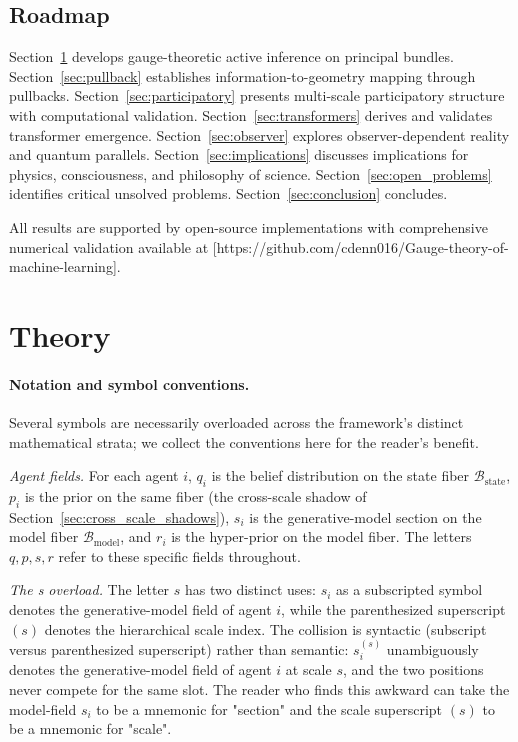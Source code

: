 \documentclass[11pt]{article}
\begin{document}
\subsection{Roadmap}

Section~\ref{sec:framework} develops gauge-theoretic active inference on principal bundles. Section~\ref{sec:pullback} establishes information-to-geometry mapping through pullbacks. Section~\ref{sec:participatory} presents multi-scale participatory structure with computational validation. Section~\ref{sec:transformers} derives and validates transformer emergence. Section~\ref{sec:observer} explores observer-dependent reality and quantum parallels. Section~\ref{sec:implications} discusses implications for physics, consciousness, and philosophy of science. Section~\ref{sec:open_problems} identifies critical unsolved problems. Section~\ref{sec:conclusion} concludes.

All results are supported by open-source implementations with comprehensive numerical validation available at [https://github.com/cdenn016/Gauge-theory-of-machine-learning].

\section{Theory}
\label{sec:framework}

\paragraph{Notation and symbol conventions.}
Several symbols are necessarily overloaded across the framework's distinct mathematical strata; we collect the conventions here for the reader's benefit.

\emph{Agent fields.} For each agent $i$, $q_i$ is the belief distribution on the state fiber $\mathcal{B}_{\mathrm{state}}$, $p_i$ is the prior on the same fiber (the cross-scale shadow of Section~\ref{sec:cross_scale_shadows}), $s_i$ is the generative-model section on the model fiber $\mathcal{B}_{\mathrm{model}}$, and $r_i$ is the hyper-prior on the model fiber. The letters $q, p, s, r$ refer to these specific fields throughout.

\emph{The s overload.} The letter $s$ has two distinct uses: $s_i$ as a subscripted symbol denotes the generative-model field of agent $i$, while the parenthesized superscript $(s)$ denotes the hierarchical scale index. The collision is syntactic (subscript versus parenthesized superscript) rather than semantic: $s_i^{(s)}$ unambiguously denotes the generative-model field of agent $i$ at scale $s$, and the two positions never compete for the same slot. The reader who finds this awkward can take the model-field $s_i$ to be a mnemonic for "section" and the scale superscript $(s)$ to be a mnemonic for "scale".
\end{document}
